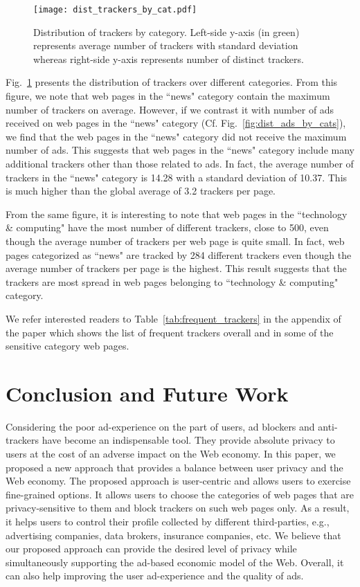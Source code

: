 \documentclass[conference]{IEEEtran}
\begin{document}
\begin{figure}
\centering
\texttt{[image: dist\_trackers\_by\_cat.pdf]}
\caption{Distribution of trackers by category. Left-side y-axis (in green) represents average number of trackers with standard deviation whereas
right-side y-axis represents number of distinct trackers.}
\label{fig:dist_trackers_by_cat}
\end{figure}
Fig.~\ref{fig:dist_trackers_by_cat} presents the distribution of trackers over different categories.
From this figure, we note that web pages in the ``news" category contain the maximum number of trackers on average.
However, if we contrast it with number of ads received on web pages in the ``news" category (Cf. Fig.~\ref{fig:dist_ads_by_cats}), 
we find that the web pages in the ``news" category did not receive the maximum number of ads.
This suggests that web pages in the ``news" category include many additional trackers other than those related to ads.
In fact, the average number of trackers in the ``news" category is 14.28 with a standard deviation of 10.37.
This is much higher than the global average of 3.2 trackers per page.


From the same figure, it is interesting to note that web pages in the ``technology \& computing" 
have the most number of different trackers, close to 500, even though the average number of trackers per web page is quite small. 
In fact, web pages categorized as ``news" are tracked by 284 different trackers even though the average number of trackers per page is the highest.
This result suggests that the trackers are most spread in web pages belonging to ``technology \& computing" category.

We refer interested readers to Table~\ref{tab:frequent_trackers} in the appendix of the paper which shows the list 
of frequent trackers overall and in some of the sensitive category web pages.









\section{Conclusion and Future Work}
\label{sec:conclusion}

Considering the poor ad-experience on the part of users, ad blockers and anti-trackers have become an indispensable tool.
They provide absolute privacy to users at the cost of an adverse impact on the Web economy.
In this paper, we proposed a new approach that provides a balance between user privacy and the Web economy.
The proposed approach is user-centric and allows users to exercise fine-grained options.
It allows users to choose the categories of web pages that are privacy-sensitive to them and block trackers on such web pages only.
As a result, it helps users to control their profile collected by different third-parties, e.g., advertising companies, data brokers, insurance companies, etc.
 We believe that our proposed approach can provide the desired level of privacy while simultaneously supporting the ad-based economic model of the Web.
Overall, it can also help improving the user ad-experience and the quality of ads.
\end{document}
